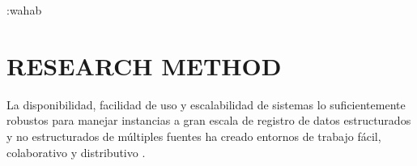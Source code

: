 \documentclass[a4paper,fleqn,spanish]{cas-dc}
\begin{document}


:wahab%




\section{RESEARCH METHOD }\label{metodo}

La disponibilidad, facilidad de uso y escalabilidad de sistemas lo
suficientemente robustos para manejar instancias a gran escala de registro de
datos estructurados y no estructurados de múltiples fuentes ha creado entornos
de trabajo fácil, colaborativo y distributivo
\cite{wieringa_requirements_2006, kitchenham_guidelines_2007, webster_analyzing_2002}.
\end{document}
